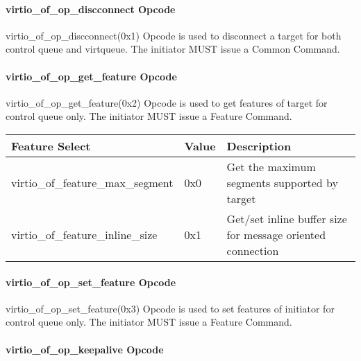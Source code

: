 \paragraph{virtio_of_op_discconnect Opcode}\label{sec:Virtio Transport Options / Virtio Over Fabrics / Transmition Protocol / Opcodes Definition / virtio_of_op_discconnect Opcode}

virtio_of_op_discconnect(0x1) Opcode is used to disconnect a target for both control queue and virtqueue. The initiator MUST issue a Common Command.


\paragraph{virtio_of_op_get_feature Opcode}\label{sec:Virtio Transport Options / Virtio Over Fabrics / Transmition Protocol / Opcodes Definition / virtio_of_op_get_feature Opcode}

virtio_of_op_get_feature(0x2) Opcode is used to get features of target for control queue only. The initiator MUST issue a Feature Command.

\begin{tabular}{ |l|l|l| }
\hline
Feature Select & Value & Description \\
\hline
virtio_of_feature_max_segment & 0x0 & Get the maximum segments supported by target \\
\hline
virtio_of_feature_inline_size & 0x1 & Get/set inline buffer size for message oriented connection \\
\hline
\end{tabular}

\paragraph{virtio_of_op_set_feature Opcode}\label{sec:Virtio Transport Options / Virtio Over Fabrics / Transmition Protocol / Opcodes Definition / virtio_of_op_set_feature Opcode}

virtio_of_op_set_feature(0x3) Opcode is used to set features of initiator for control queue only. The initiator MUST issue a Feature Command.

\paragraph{virtio_of_op_keepalive Opcode}\label{sec:Virtio Transport Options / Virtio Over Fabrics / Transmition Protocol / Opcodes Definition / virtio_of_op_keepalive Opcode}

